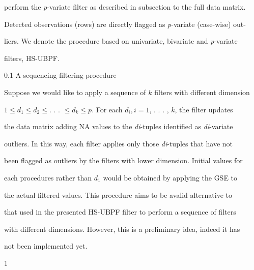 \documentclass[a4paper,12pt]{article}
\begin{document}
perform the {\it p}-variate filter as described in subsection to the full data matrix.

Detected observations (rows) are directly flagged as {\it p}-variate (case-wise) out-

liers. We denote the procedure based on univariate, bivariate and {\it p}-variate

filters, HS-UBPF.

0.1 A sequencing filtering procedure

Suppose we would like to apply a sequence of $k$ filters with different dimension

$1 \leq d_{1} \leq d_{2} \leq.$ . . $\leq d_{k} \leq p$. For each $d_{i}, i = 1$, . . . , $k$, the filter updates

the data matrix adding NA values to the {\it di}-tuples identified as {\it di}-variate

outliers. In this way, each filter applies only those {\it di}-tuples that have not

been flagged as outliers by the filters with lower dimension. Initial values for

each procedures rather than $d_{1}$ would be obtained by applying the GSE to

the actual filtered values. This procedure aims to be avalid alternative to

that used in the presented HS-UBPF filter to perform a sequence of filters

with different dimensions. However, this is a preliminary idea, indeed it has

not been implemented yet.

1
\end{document}
